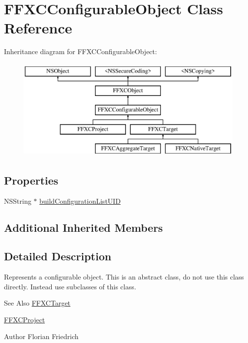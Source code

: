 \hypertarget{interface_f_f_x_c_configurable_object}{\section{F\-F\-X\-C\-Configurable\-Object Class Reference}
\label{interface_f_f_x_c_configurable_object}
}
Inheritance diagram for F\-F\-X\-C\-Configurable\-Object\-:\begin{figure}[H]
\begin{center}
\leavevmode
\includegraphics[height=5.000000cm]{interface_f_f_x_c_configurable_object}
\end{center}
\end{figure}
\subsection*{Properties}
\begin{DoxyCompactItemize}
\item 
N\-S\-String $\ast$ \hyperlink{interface_f_f_x_c_configurable_object_af8a83b598d2f7a3807615f4d1557850c}{build\-Configuration\-List\-U\-I\-D}
\end{DoxyCompactItemize}
\subsection*{Additional Inherited Members}


\subsection{Detailed Description}
Represents a configurable object. This is an abstract class, do not use this class directly. Instead use subclasses of this class. \begin{DoxySeeAlso}{See Also}
\hyperlink{interface_f_f_x_c_target}{F\-F\-X\-C\-Target} 

\hyperlink{interface_f_f_x_c_project}{F\-F\-X\-C\-Project} 
\end{DoxySeeAlso}
\begin{DoxyAuthor}{Author}
Florian Friedrich 
\end{DoxyAuthor}



